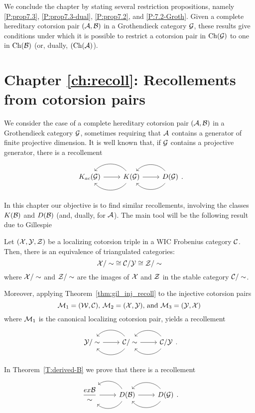 We conclude the chapter by stating several restriction propositions, namely \ref{P:prop7.3}, \ref{P:prop7.3-dual}, \ref{P:prop7.2}, and \ref{P:7.2-Groth}. Given a complete hereditary cotorsion pair $(\mathcal{A},\mathcal{B})$ in a Grothendieck category $\mathcal{G}$, these results give conditions under which it is possible to restrict a cotorsion pair in $\mathrm{Ch}(\mathcal{G})$ to one in $\mathrm{Ch}(\mathcal{B})$ (or, dually, $(\mathrm{Ch}(\mathcal{A})$).

\section*{Chapter \ref{ch:recoll}: Recollements from cotorsion pairs}

We consider the case of a complete hereditary cotorsion pair $(\mathcal{A},\mathcal{B})$ in a Grothendieck category $\mathcal{G}$, sometimes requiring that $\mathcal{A}$ contains a generator of finite projective dimension. It is well known that, if $\mathcal{G}$ contains a projective generator, there is a recollement
\begin{equation*}
  \recdiagram{K_{ac}(\G)}{K(\G)}{D(\G)}.
\end{equation*}

In this chapter our objective is to find similar recollements, involving the classes $K(\mathcal{B})$ and $D(\mathcal{B})$ (and, dually, for $\mathcal{A}$). The main tool will be the following result due to Gillespie \cite[Corollary~4.5]{G7}

\begin{nonlisting_cor}[\ref{cor:gill_local_recoll}]
  Let $(\mathcal{X},\mathcal{Y},\mathcal{Z})$ be a localizing cotorsion triple in a WIC Frobenius category $\mathcal{C}$. Then, there is an equivalence of triangulated categories:
  \[ {\mathcal{X}/\sim} \cong {\mathcal{C}/\mathcal{Y}}  \cong {\mathcal{Z}/\sim} \]
  where $\mathcal{X}/\sim$ and $\mathcal{Z}/\sim$ are the images of $\mathcal{X}$ and $\mathcal{Z}$ in the stable category $\mathcal{C}/\sim$.

  Moreover, applying Theorem~\ref{thm:gil_inj_recoll} to the injective cotorsion pairs
  \[ \mathcal{M}_1=(\mathcal{W},\mathcal{C})\text{, }\mathcal{M}_2=(\mathcal{X},\mathcal{Y})\text{, and }\mathcal{M}_3=(\mathcal{Y},\mathcal{X}) \]
  where $\mathcal{M}_1$ is the canonical localizing cotorsion pair, yields a recollement
  \begin{equation*}
    \recdiagram{\Y/\sim}{\C/\sim}{\C/\Y}.
  \end{equation*}
\end{nonlisting_cor}

In Theorem~\ref{T:derived-B} we prove that there is a recollement
\begin{equation*}
  \recdiagram{\dfrac{ex\B}{\sim}}{D(\B)}{D(\G)}.
\end{equation*}


